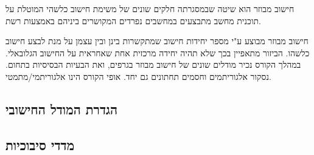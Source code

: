 \begin{displayquote}
חישוב מבוזר הוא שיטה שבמסגרתה חלקים שונים של משימת חישוב כלשהי המוטלת על תוכנית מחשב מתבצעים במחשבים נפרדים המקושרים ביניהם באמצעות רשת.
\end{displayquote}

חישוב מבוזר מבוצע ע"י מספר יחידות חישוב שמתקשרות בינן ובין עצמן על מנת לבצע חישוב כלשהו. הביזור מתאפיין בכך שלא תהיה יחידה מרכזית אחת שאחראית על החישוב הגלובאלי.
במהלך הקורס נכיר מודלים שונים של חישוב מבוזר בגרפים, ואת הבעיות הבסיסיות בתחום. נסקור אלגוריתמים וחסמים תחתונים גם יחד. אופי הקורס הינו אלגוריתמי/מתמטי.

\subsection{הגדרת המודל החישובי}
\subsection{מדדי סיבוכיות}
